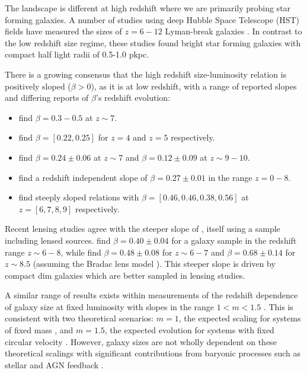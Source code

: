 The landscape is different at high redshift where we are primarily probing star forming galaxies. A number of studies using deep Hubble Space Telescope (HST) fields have measured the sizes of $z=6-12$ Lyman-break galaxies \citep{Oesch_2010, Grazian_2012, Mosleh_2012, Ono_2013, Huang_2013, Holwerda_2015, Kawamata_2015, Shibuya2015, Kawamata_2018, Holwerda2020}. In contrast to the low redshift size regime, these studies found bright star forming galaxies with compact half light radii of 0.5-1.0 pkpc. 

There is a growing consensus that the high redshift size-luminosity relation is positively sloped ($\beta>0$), as it is at low redshift, with a range of reported slopes and differing reports of $\beta$'s redshift evolution:
\begin{itemize}
    \item \cite{Grazian_2012} find $\beta=0.3-0.5$ at $z\sim7$.
    \item \cite{Huang_2013} find $\beta=[0.22, 0.25]$ for $z=4$ and $z=5$ respectively.
    \item \cite{Holwerda_2015} find $\beta=0.24\pm0.06$ at $z\sim7$ and $\beta=0.12\pm0.09$ at $z\sim9-10$.
    \item \cite{Shibuya2015} find a redshift independent slope of $\beta=0.27\pm0.01$ in the range $z=0-8$.
    \item \cite{Kawamata_2018} find steeply sloped relations with $\beta=[0.46, 0.46, 0.38, 0.56]$ at $z=[6, 7, 8, 9]$ respectively.
\end{itemize}
Recent lensing studies agree with the steeper slope of \cite{Kawamata_2018}, itself using a sample including lensed sources. \cite{Bouwens2021} find $\beta=0.40\pm0.04$ for a galaxy sample in the redshift range $z\sim6-8$, while \cite{Yang2022} find $\beta=0.48\pm0.08$ for $z\sim6-7$ and $\beta=0.68\pm0.14$ for $z\sim8.5$ (assuming the Bradac lens model \cite{Bradac04}). This steeper slope is driven by compact dim galaxies which are better sampled in lensing studies.

A similar range of results exists within measurements of the redshift dependence of galaxy size at fixed luminosity with slopes in the range $1<m<1.5$ \citep{Bouwens_2004, Oesch_2010, Ono_2013, Kawamata_2015, Shibuya2015, Laporte_2016, Kawamata_2018}. This is consistent with two theoretical scenarios: $m=1$, the expected scaling for systems of fixed mass \citep[e.g.][]{Bouwens_2004}, and $m=1.5$, the expected evolution for systems with fixed circular velocity \citep[e.g.][]{Ferguson_2004, Hathi_2008}.
However, galaxy sizes are not wholly dependent on these theoretical scalings with significant contributions from baryonic processes such as stellar and AGN feedback \citep{Wyithe_2011}.

